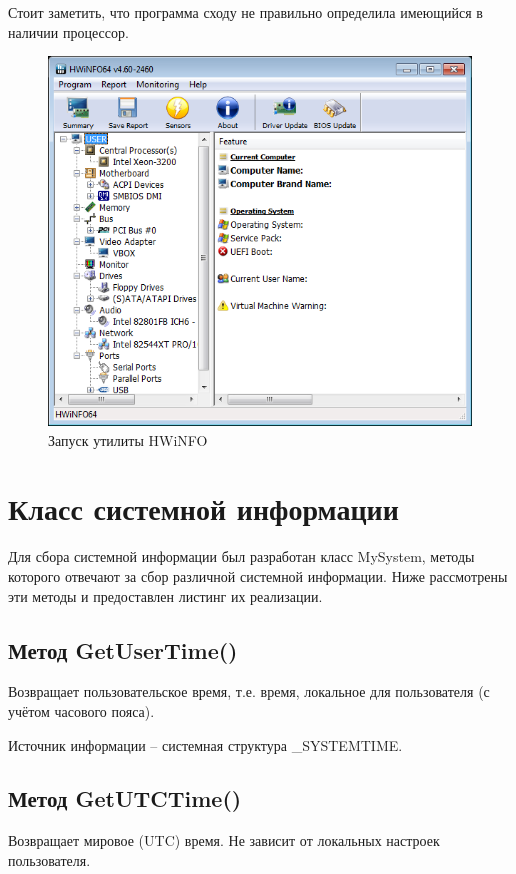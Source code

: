 \documentclass[a4paper, 12pt]{report}		%
\begin{document}
Стоит заметить, что программа сходу не правильно определила имеющийся в наличии процессор.

\begin{figure}[h!]
\centering
\includegraphics[scale=0.85]{res/hwinfo}
\caption{Запуск утилиты HWiNFO}
\end{figure}


\chapter*{Класс системной информации}

\vspace{1em}

Для сбора системной информации был разработан класс MySystem, методы которого отвечают за сбор различной системной информации. Ниже рассмотрены эти методы и предоставлен листинг их реализации.

\section*{Метод GetUserTime()}
Возвращает пользовательское время, т.е. время, локальное для пользователя (с учётом часового пояса).

Источник информации -- системная структура \_SYSTEMTIME.

\section*{Метод GetUTCTime()}
Возвращает мировое (UTC) время. Не зависит от локальных настроек пользователя.
\end{document}
